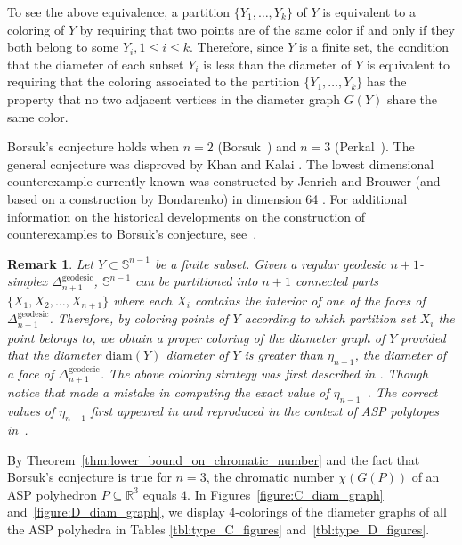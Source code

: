 \documentclass[12pt]{amsart}
\theoremstyle{plain}
\newtheorem{remark}[theorem]{Remark}
\newcommand{\R}{\mathbb{R}}
\newcommand{\Sp}{\mathbb{S}}
\newcommand{\diam}{\mathrm{diam}}
\numberwithin{equation}{section}
\begin{document}
To see the above equivalence, a partition $\{Y_1, \ldots, Y_k\}$ of
$Y$ is equivalent to a coloring of $Y$ by requiring that two points
are of the same color if and only if they both belong to some $Y_i,
1\leq i\leq k$.  Therefore, since $Y$ is a finite set, the condition
that the diameter of each subset $Y_i$ is less than the diameter of
$Y$ is equivalent to requiring that the coloring associated to the
partition $\{Y_1, \ldots, Y_k\}$ has the property that no two adjacent
vertices in the diameter graph $G(Y)$ share the same color.


Borsuk's conjecture holds when $n=2$ (Borsuk~\cite{borsuk1933drei})
and $n=3$ (Perkal~\cite{perkal1947subdivision}).  The general
conjecture was disproved by Khan and Kalai
\cite{kahn1993counterexample}.  The lowest dimensional counterexample
currently known was constructed by Jenrich and Brouwer (and based on a
construction by Bondarenko) in dimension 64 \cite{jenrich}.  For
additional information on the historical developments on the
construction of counterexamples to Borsuk’s conjecture,
see~\cite[Section~2]{raigorodskii2013cliques}.

\begin{remark}\label{rmk:large_diam_color}
Let $Y\subset \Sp^{n-1}$ be a finite subset.
Given a regular geodesic $n+1$-simplex $\Delta_{n+1}^{\mathrm{geodesic}}$, $\Sp^{n-1}$ can be partitioned into $n+1$ connected parts $\{X_1, X_2,\ldots, X_{n+1}\}$ where each $X_i$ contains the interior of one of the faces of $\Delta^\mathrm{geodesic}_{n+1}$.
Therefore, by coloring points of $Y$ according to which partition set $X_i$ the point belongs to, we obtain a proper coloring of the diameter graph of $Y$ provided that the diameter $\diam(Y)$ diameter of $Y$ is greater than $\eta_{n-1}$, the diameter of a face of $\Delta^\mathrm{geodesic}_{n+1}$.
The above coloring strategy was first described in \cite[Section~0]{lovasz1983self}.
Though notice that \cite{lovasz1983self} made a mistake in computing the exact value of $\eta_{n-1}$~\cite{raigorodskii2012chromatic,raigorodskii2013cliques}.
The correct values of $\eta_{n-1}$ first appeared in \cite{santalo1946convex} and reproduced in the context of ASP polytopes in~\cite{horvath2021strongly}.
\end{remark}

By Theorem~\ref{thm:lower_bound_on_chromatic_number} and the fact that
Borsuk's conjecture is true for $n=3$, the chromatic number
$\chi(G(P))$ of an ASP polyhedron $P\subseteq\R^3$ equals $4$.  In
Figures~\ref{figure:C_diam_graph} and~\ref{figure:D_diam_graph}, we
display $4$-colorings of the diameter graphs of all the ASP polyhedra
in Tables \ref{tbl:type_C_figures} and~\ref{tbl:type_D_figures}.
\end{document}
